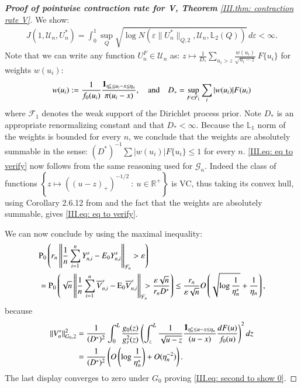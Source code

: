 \begin{proof}[\hypertarget{III.proof contraction pointwise V}{\textbf{Proof of pointwise contraction rate for V, Theorem} \ref{III.thm: contraction rate V}}]
    We show:
    \begin{align}\label{III.eq: eq to verify}
    J(1, \mathcal{U}_n, U_n^{*}) = \int_{0}^{1} \sup_{Q} \sqrt{\log{N\left(\varepsilon \| U_n^{*}\|_{Q,2},\mathcal{U}_n, \mathbb{L}_2(Q)  \right)}} \, d\varepsilon < \infty.
    \end{align}
    Note that we can write any function $U^{\scriptscriptstyle{F}}_n \in \mathcal{U}_n$ as: $z \mapsto   \frac{1}{D_{*}}\sum_{u_i >z} \frac{w(u_i)}{\sqrt{u_i-z}}  \, F\{u_i\}$ for weights $w(u_i)$:
    $$ w(u_i) := \frac{1}{f_0(u_i)}\frac{\mathbf{1}_{\eta_n^* \leq u_i - x \leq \eta_n}}{\pi (u_i-x)}, \quad \text{and} \quad D_{*} = \sup_{F \in \mathcal{F}_1}\sum_i |w(u_i)| F(u_i)$$
    where $\mathcal{F}_1$ denotes the weak support of the Dirichlet process prior. Note $D_{*}$ is an appropriate renormalizing constant and that $D_{*} < \infty$. Because the $\mathbb{L}_1$ norm of the weights is bounded for every $n$, we conclude that the weights are absolutely summable in the sense: $(D^*)^{-1} \sum |w(u_i)| F\{u_i\} \leq 1 $ for every $n$. \eqref{III.eq: eq to verify} now follows from the same reasoning used for $\mathcal{G}_n$. Indeed the class of functions $\left\{ z \mapsto ((u-z)_+)^{-1/2} \: : \: u \in \mathbb{R}^+ \right\}$ is VC, thus taking its convex hull, using Corollary 2.6.12 from \cite{5} and the fact that the weights are absolutely summable, gives \eqref{III.eq: eq to verify}.
    
    We can now conclude by using the maximal inequality:
    \begin{align*}
        &\pb_0 \left( r_n \left\| \frac{1}{n} \sum_{i=1}^n Y_{n,i}^{\scriptscriptstyle{F}} - E_0 Y_{n,i}^{\scriptscriptstyle{F}} \right\|_{\mathcal{F}_n} > \varepsilon \right) \\
        &= \pb_0 \left( \sqrt{n} \left\| \frac{1}{n} \sum_{i=1}^n \overline{V}_{n,i}^{\scriptscriptstyle{F}} - \ex_{0} \overline{V}_{n,i}^{\scriptscriptstyle{F}} \right\|_{\mathcal{F}_n} \hspace{-0.2cm} > \frac{\varepsilon \sqrt{n}}{r_n D^*} \right) \leq \frac{ r_n}{\varepsilon \sqrt{n}} O  \left( \sqrt{\log \frac{1}{\eta_n^*}} + \frac{1}{\eta_n} \right), 
    \end{align*}
    because
    \begin{align*}
        \| V_n^* \|_{G_0, 2}^2 &= \frac{1}{(D^*)^2} \int_0^L \frac{g_{0}(z)}{g_{\scriptscriptstyle{F}}^2(z)} \left( \int_z^L \frac{1}{\sqrt{u-z}} \frac{\mathbf{1}_{\eta_n^* \leq u - x \leq \eta_n}}{(u-x)} \frac{dF(u)}{f_0(u)} \right)^2 dz \\
        &= \frac{1}{(D^*)^2} \left( O \left( \log \frac{1}{\eta_n^*} \right) + O(\eta_n^{-2}) \right).
    \end{align*}
    The last display converges to zero under $G_0$ proving \eqref{III.eq: second to show 0}.


\end{proof}
